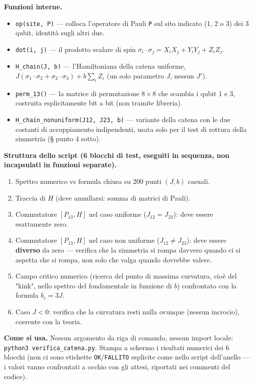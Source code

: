 \documentclass[11pt,a4paper]{article}
\begin{document}
\textbf{Funzioni interne.}
\begin{itemize}
\item \texttt{op(site,\ P)} — colloca l'operatore di Pauli \texttt{P} sul sito
indicato (1, 2 o 3) dei 3 qubit, identità sugli altri due.
\item \texttt{dot(i,\ j)} — il prodotto scalare di spin
$\sigma_i\cdot\sigma_j=X_iX_j+Y_iY_j+Z_iZ_j$.
\item \texttt{H\_chain(J,\ b)} — l'Hamiltoniana della catena uniforme,
$J(\sigma_1\cdot\sigma_2+\sigma_2\cdot\sigma_3)+b\sum_iZ_i$ (un solo parametro $J$,
nessun $J'$).
\item \texttt{perm\_13()} — la matrice di permutazione $8\times8$ che scambia i
qubit 1 e 3, costruita esplicitamente bit a bit (non tramite libreria).
\item \texttt{H\_chain\_nonuniform(J12,\ J23,\ b)} — variante della catena con le due
costanti di accoppiamento indipendenti, usata solo per il test di rottura della
simmetria (§ punto 4 sotto).
\end{itemize}

\textbf{Struttura dello script (6 blocchi di test, eseguiti in sequenza, non
incapsulati in funzioni separate).}
\begin{enumerate}
\item Spettro numerico vs formula chiusa su 200 punti $(J,b)$ casuali.
\item Traccia di $H$ (deve annullarsi: somma di matrici di Pauli).
\item Commutatore $[P_{13},H]$ nel caso uniforme ($J_{12}=J_{23}$): deve essere
esattamente zero.
\item Commutatore $[P_{13},H]$ nel caso non uniforme ($J_{12}\neq J_{23}$): deve
essere \textbf{diverso} da zero — verifica che la simmetria si rompa davvero quando
ci si aspetta che si rompa, non solo che valga quando dovrebbe valere.
\item Campo critico numerico (ricerca del punto di massima curvatura, cioè del
"kink", nello spettro del fondamentale in funzione di $b$) confrontato con la
formula $b_c=3J$.
\item Caso $J<0$: verifica che la curvatura resti nulla ovunque (nessun incrocio),
coerente con la teoria.
\end{enumerate}

\textbf{Come si usa.} Nessun argomento da riga di comando, nessun import locale:
\texttt{python3 verifica\_catena.py}. Stampa a schermo i risultati numerici dei 6
blocchi (non ci sono etichette \texttt{OK}/\texttt{FALLITO} esplicite come nello
script dell'anello — i valori vanno confrontati a occhio con gli attesi, riportati
nei commenti del codice).
\end{document}
